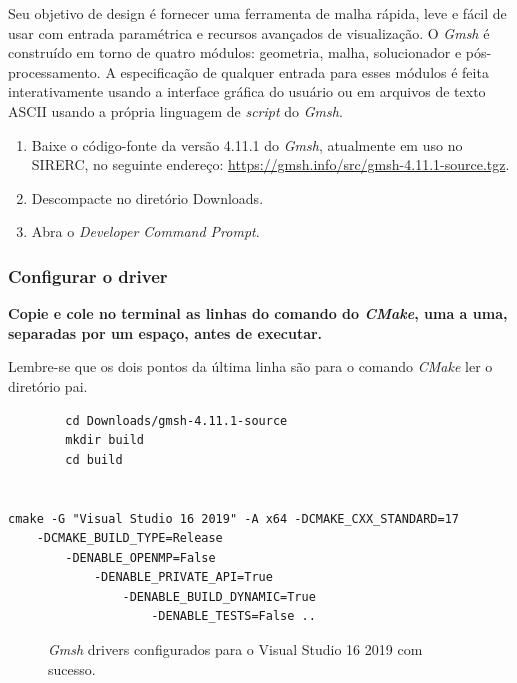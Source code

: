 \documentclass[a4paper,11pt]{article}
\newcommand{\sistema}{\textsf{SIRERC}}
\newcommand{\cmake}{\textit{CMake}}
\newcommand{\gmsh}{\textit{Gmsh}}
\newcommand{\cautionbox}[1]{
	\vskip 5mm
	\begin{leftbar}
		\textbf{#1}
	\end{leftbar}
	\vskip 5mm
}
\begin{document}
Seu objetivo de design é fornecer uma ferramenta de malha rápida, leve e fácil de usar com entrada paramétrica e recursos avançados de visualização. O \gmsh{} é construído em torno de quatro módulos: geometria, malha, solucionador e pós-processamento. A especificação de qualquer entrada para esses módulos é feita interativamente usando a interface gráfica do usuário ou em arquivos de texto ASCII usando a própria linguagem de \textit{script} do \gmsh{}.

\begin{enumerate}
	\item Baixe o código-fonte da versão 4.11.1 do \gmsh{}, atualmente em uso no \sistema{}, no seguinte endereço: \url{https://gmsh.info/src/gmsh-4.11.1-source.tgz}.
	\item Descompacte no diretório Downloads.
	\item Abra o \textit{Developer Command Prompt}.
\end{enumerate}

\subsubsection{Configurar o driver}

\cautionbox{
Copie e cole no terminal as linhas do comando do \cmake{}, uma a uma, separadas por um espaço, antes de executar.
}

Lembre-se que os dois pontos da última linha são para o comando \cmake{} ler o diretório pai.
\begin{mdframed}
	\begin{verbatim}
		cd Downloads/gmsh-4.11.1-source
		mkdir build
		cd build
		

cmake -G "Visual Studio 16 2019" -A x64 -DCMAKE_CXX_STANDARD=17
	-DCMAKE_BUILD_TYPE=Release
		-DENABLE_OPENMP=False
			-DENABLE_PRIVATE_API=True
				-DENABLE_BUILD_DYNAMIC=True
					-DENABLE_TESTS=False ..
	\end{verbatim}
\end{mdframed}


\begin{figure}[H]
	\centering
	\caption{\gmsh{} drivers configurados para o Visual Studio 16 2019 com sucesso.}
	\label{fig:gmsh_build}
\end{figure}
\end{document}

